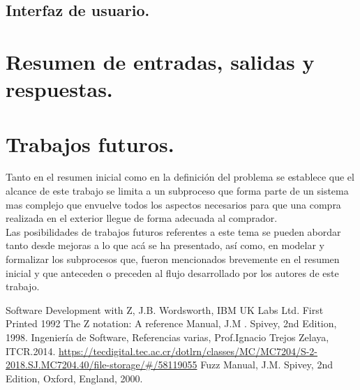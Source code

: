 \documentclass[12pt,a4paper,zed]{article}
\begin{document}

\subsection{Interfaz de usuario.}

\section{Resumen de entradas, salidas y respuestas.}

\section{Trabajos futuros.}
Tanto en el resumen inicial como en la definición del problema se establece que el alcance de este trabajo se limita a un subproceso que forma parte de un sistema mas complejo que envuelve todos los aspectos necesarios para que una compra realizada en el exterior llegue de forma adecuada al comprador.\\[\baselineskip]
\indent Las posibilidades de trabajos futuros referentes a este tema se pueden abordar tanto desde mejoras a lo que acá se ha presentado, así como, en modelar y formalizar los subprocesos que, fueron mencionados brevemente en el resumen inicial y que anteceden o preceden al flujo desarrollado por los autores de este trabajo.


\newpage
\begin{thebibliography}{00}
 Software Development with Z, J.B. Wordsworth, IBM UK Labs Ltd. First Printed 1992
 The Z notation: A reference Manual, J.M . Spivey, 2nd Edition, 1998.
 Ingeniería de Software, Referencias varias, Prof.Ignacio Trejos Zelaya, ITCR.2014. \url{https://tecdigital.tec.ac.cr/dotlrn/classes/MC/MC7204/S-2-2018.SJ.MC7204.40/file-storage/#/58119055}
 Fuzz Manual, J.M. Spivey, 2nd Edition, Oxford, England, 2000.
\end{thebibliography}
\end{document}
